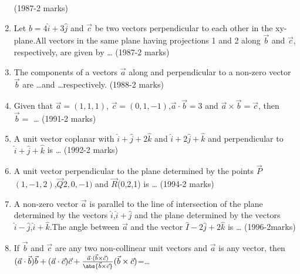 \begin{enumerate}
\hfill{(1987-2 marks)}
\item Let $b=4\hat{i}+3\hat{j}$ and $\vec{c}$ be two vectors perpendicular to each other in the xy-plane.All vectors in the same plane having projections 1 and 2 along $\vec{b}$ and $\vec{c}$, respectively, are given by \dots
\hfill{(1987-2 marks)}
\item The components of a vectors $\vec{a}$ along and  perpendicular to a non-zero vector $\vec{b}$ are \dots and \dots respectively.
\hfill{(1988-2 marks)}
\item Given that $\vec{a}=(1,1,1)$, $\vec{c}=(0,1,-1)$,$\vec{a}\cdot\vec{b}=3$ and $\vec{a}\times\vec{b}=\vec{c}$, then $\vec{b}=$ \dots
\hfill{(1991-2 marks)}
\item A unit vector coplanar with $\hat{i}+\hat{j}+2\hat{k}$ and $\hat{i}+2\hat{j}+\hat{k}$ and perpendicular to $\hat{i}+\hat{j}+\hat{k}$ is \dots
\hfill{(1992-2 marks)}
\item A unit vector perpendicular to the plane determined by the points $\vec{P}$$(1,-1,2)$,$\vec{Q}2,0,-1)$ and $\vec{R}$(0,2,1) is \dots
\hfill{(1994-2 marks)}
\item A non-zero vector $\vec{a}$ is parallel to the line of intersection of the plane determined by the vectors $\hat{i}$,$\hat{i}+\hat{j}$ and the plane determined by the vectors $\hat{i}-\hat{j}$,$\hat{i}+\hat{k}$.The angle between $\vec{a}$ and the vector $\hat{I}-2\hat{j}+2\hat{k}$ is \dots
\hfill{(1996-2marks)}
\item If $\vec{b}$ and $\vec{c}$ are any two non-collinear unit vectors and $\vec{a}$ is any vector, then $(\vec{a}\cdot\vec{b})\vec{b}+(\vec{a}\cdot\vec{c})\vec{c}+\frac{\vec{a}\cdot(\vec{b}\times\vec{c})}{\abs{\vec{b}\times\vec{c}}}(\vec{b}\times\vec{c})$=\dots

\end{enumerate}

